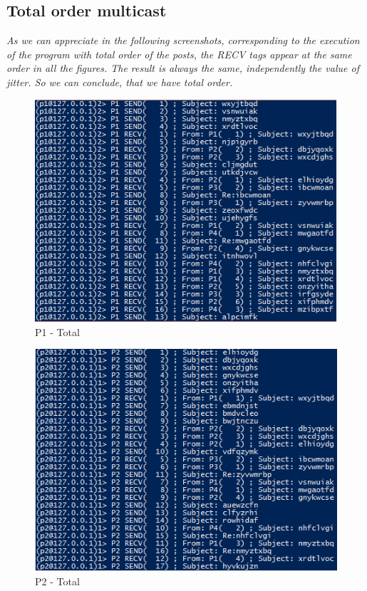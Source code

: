\clearpage
\subsection{Total order multicast}
\textit{As we can appreciate in the following screenshots, corresponding to the execution of the program with total order of the posts, the RECV tags appear at the same order in all the figures. The result is always the same, independently the value of jitter. So we can conclude, that we have total order.}

\begin{figure}[h!]
\centering
\includegraphics[scale=0.9]{sections/screenshots/totalP1.png}
\caption{P1 - Total}
\label{fig:p1_Total}
\end{figure}

\begin{figure}[h!]
\centering
\includegraphics[scale=0.9]{sections/screenshots/totalP2.png}
\caption{P2 - Total}
\label{fig:p2_Total}
\end{figure}

